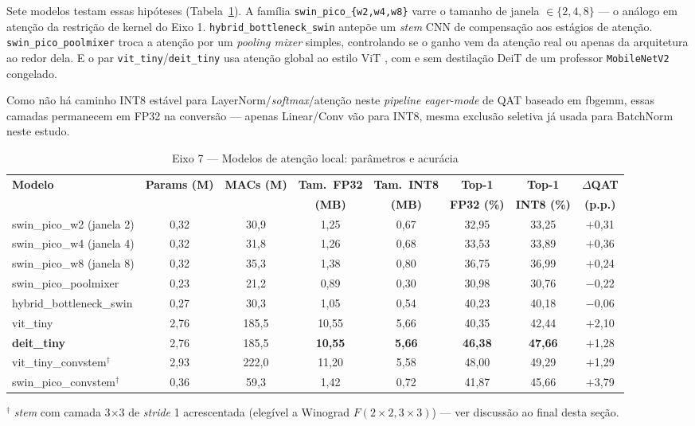 \documentclass[conference]{IEEEtran}
\begin{document}
Sete modelos testam essas hipóteses (Tabela~\ref{tab:phase8_models}). A família
\texttt{swin\_pico\_\{w2,w4,w8\}} varre o tamanho de janela $\in\{2,4,8\}$ — o análogo em atenção da
restrição de kernel do Eixo 1. \texttt{hybrid\_bottleneck\_swin} antepõe um \textit{stem} CNN de
compensação aos estágios de atenção. \texttt{swin\_pico\_poolmixer} troca a atenção por um
\textit{pooling mixer} simples, controlando se o ganho vem da atenção real ou apenas da arquitetura
ao redor dela. E o par \texttt{vit\_tiny}/\texttt{deit\_tiny} usa atenção global ao estilo ViT
\cite{dosovitskiy2020vit}, com e sem destilação DeiT \cite{touvron2021distillation} de um professor
\texttt{MobileNetV2} congelado.

Como não há caminho INT8 estável para LayerNorm/\textit{softmax}/atenção neste \textit{pipeline}
\textit{eager-mode} de QAT baseado em fbgemm, essas camadas permanecem em FP32 na conversão —
apenas Linear/Conv vão para INT8, mesma exclusão seletiva já usada para BatchNorm neste estudo.

\begin{table}[!t]
\caption{Eixo 7 — Modelos de atenção local: parâmetros e acurácia}
\label{tab:phase8_models}
\centering
\small
\begin{tabular}{@{}lccccccc@{}}
\toprule
\textbf{Modelo} & \textbf{Params (M)} & \textbf{MACs (M)} & \textbf{Tam.\ FP32} & \textbf{Tam.\ INT8} & \textbf{Top-1} & \textbf{Top-1} & \textbf{$\Delta$QAT} \\
 & & & \textbf{(MB)} & \textbf{(MB)} & \textbf{FP32 (\%)} & \textbf{INT8 (\%)} & \textbf{(p.p.)} \\
\midrule
swin\_pico\_w2 (janela 2) & 0,32 & 30,9 & 1,25 & 0,67 & 32,95 & 33,25 & $+$0,31 \\
swin\_pico\_w4 (janela 4) & 0,32 & 31,8 & 1,26 & 0,68 & 33,53 & 33,89 & $+$0,36 \\
swin\_pico\_w8 (janela 8) & 0,32 & 35,3 & 1,38 & 0,80 & 36,75 & 36,99 & $+$0,24 \\
swin\_pico\_poolmixer & 0,23 & 21,2 & 0,89 & 0,30 & 30,98 & 30,76 & $-$0,22 \\
hybrid\_bottleneck\_swin & 0,27 & 30,3 & 1,05 & 0,54 & 40,23 & 40,18 & $-$0,06 \\
vit\_tiny & 2,76 & 185,5 & 10,55 & 5,66 & 40,35 & 42,44 & $+$2,10 \\
\textbf{deit\_tiny} & 2,76 & 185,5 & \textbf{10,55} & \textbf{5,66} & \textbf{46,38} & \textbf{47,66} & $+$1,28 \\
vit\_tiny\_convstem$^\dagger$ & 2,93 & 222,0 & 11,20 & 5,58 & 48,00 & 49,29 & $+$1,29 \\
swin\_pico\_convstem$^\dagger$ & 0,36 & 59,3 & 1,42 & 0,72 & 41,87 & 45,66 & $+$3,79 \\
\bottomrule
\end{tabular}

\vspace{2pt}
{\footnotesize $^\dagger$ \textit{stem} com camada 3$\times$3 de \textit{stride} 1 acrescentada (elegível a
Winograd $F(2\times2,3\times3)$) --- ver discussão ao final desta seção.}
\end{table}
\end{document}
